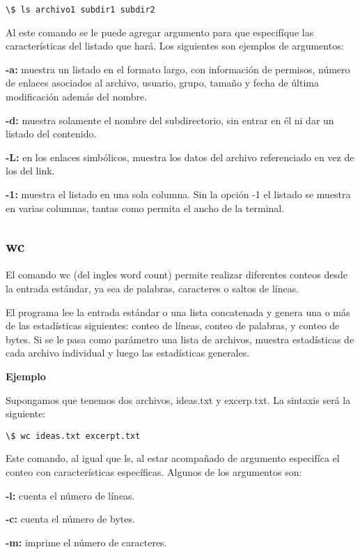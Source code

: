 \documentclass[12pt]{article}
\begin{document}
\begin{verbatim}
\$ ls archivo1 subdir1 subdir2
\end{verbatim}

Al este comando se le puede agregar argumento para que especifíque las características del listado que hará. Los siguientes son ejemplos de argumentos:

\textbf{-a:} muestra un listado en el formato largo, con información de permisos, número de enlaces asociados al archivo, usuario, grupo, tamaño y fecha de última modificación además del nombre.

\textbf{-d:} muestra solamente el nombre del subdirectorio, sin entrar en él ni dar un listado del contenido.

\textbf{-L:}  en los enlaces simbólicos, muestra los datos del archivo referenciado en vez de los del link.

\textbf{-1:} muestra el listado en una sola columna. Sin la opción -1 el listado se muestra en varias columnas, tantas como permita el ancho de la terminal.

\subsection{wc}

El comando wc (del ingles word count) permite realizar diferentes conteos desde la entrada estándar, ya sea de palabras, caracteres o saltos de líneas.

El programa lee la entrada estándar o una lista concatenada y genera una o más de las estadísticas siguientes: conteo de líneas, conteo de palabras, y conteo de bytes. Si se le pasa como parámetro una lista de archivos, muestra estadísticas de cada archivo individual y luego las estadísticas generales.

\textbf{Ejemplo}

Supongamos que tenemos dos archivos, ideas.txt y excerp.txt. La sintaxis será la siguiente:

\begin{verbatim}
\$ wc ideas.txt excerpt.txt
\end{verbatim}

Este comando, al igual que ls, al estar acompañado de argumento especifíca el conteo con características específicas. Algunos de los argumentos son:

\textbf{-l:} cuenta el número de líneas.

\textbf{-c:} cuenta el número de bytes.

\textbf{-m:} imprime el número de caracteres.
\end{document}
